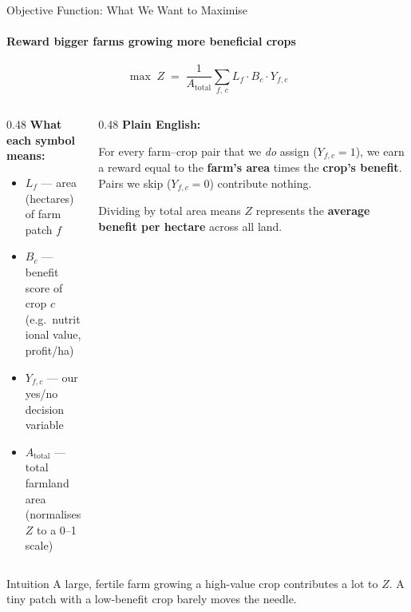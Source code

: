 \documentclass[aspectratio=169,10pt]{beamer}
\begin{document}
\begin{frame}{Objective Function: What We Want to Maximise}
    \framesubtitle{Reward bigger farms growing more beneficial crops}

    \begin{equation*}
        \max\; Z \;=\; \frac{1}{A_{\text{total}}}
        \sum_{f,\, c} L_f \cdot B_c \cdot Y_{f,c}
    \end{equation*}

    \vspace{0.4cm}
    \begin{columns}[T]
        \begin{column}{0.48\textwidth}
            \textbf{What each symbol means:}
            \vspace{0.2cm}
            \begin{itemize}
                \item $L_f$ --- area (hectares) of farm patch $f$
                \item $B_c$ --- benefit score of crop $c$\\
                      {\small (e.g.\ nutritional value, profit/ha)}
                \item $Y_{f,c}$ --- our yes/no decision variable
                \item $A_{\text{total}}$ --- total farmland area\\
                      {\small (normalises $Z$ to a 0--1 scale)}
            \end{itemize}
        \end{column}
        \begin{column}{0.48\textwidth}
            \textbf{Plain English:}
            \vspace{0.2cm}

            For every farm--crop pair that we \emph{do} assign
            ($Y_{f,c}=1$), we earn a reward equal to the
            \textbf{farm's area} times the \textbf{crop's benefit}.
            Pairs we skip ($Y_{f,c}=0$) contribute nothing.

            \vspace{0.3cm}
            Dividing by total area means $Z$ represents the
            \textbf{average benefit per hectare} across all land.
        \end{column}
    \end{columns}

    \vspace{0.3cm}
    \begin{exampleblock}{Intuition}
        A large, fertile farm growing a high-value crop contributes
        a lot to $Z$. A tiny patch with a low-benefit crop barely moves the needle.
    \end{exampleblock}
\end{frame}
\end{document}
